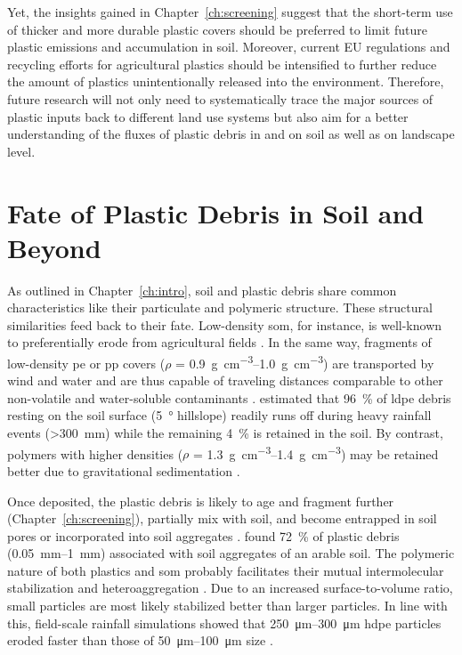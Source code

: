 Yet, the insights gained in Chapter~\ref{ch:screening} suggest that the short-term use of thicker and more durable plastic covers should be preferred to limit future plastic emissions and accumulation in soil. Moreover, current EU regulations \citep{EN13655Plastics2018} and recycling efforts for agricultural plastics should be intensified to further reduce the amount of plastics unintentionally released into the environment.
Therefore, future research will not only need to systematically trace the major sources of plastic inputs back to different land use systems but also aim for a better understanding of the fluxes of plastic debris in and on soil as well as on landscape level.

\section{Fate of Plastic Debris in Soil and Beyond}
\label{sec:general-discussion:fate}

As outlined in Chapter~\ref{ch:intro}, soil and plastic debris share common characteristics like their particulate and polymeric structure. These structural similarities feed back to their fate.
Low-density \ac{som}, for instance, is well-known to preferentially erode from agricultural fields \citep{LalSoil2005,RumpelPreferential2006}. In the same way, fragments of low-density \ac{pe} or \ac{pp} covers ($\rho$ = \SIrange{0.9}{1.0}{\gram\per\cubic\centi\meter}) are transported by wind \citep{RezaeiWind2019,BullardPreferential2021} and water \citep{LaermannsTracing2021,RehmSoil2021} and are thus capable of traveling distances comparable to other non-volatile and water-soluble contaminants \citep{StubbinsPlastics2021}.  estimated that \SI{96}{\percent} of \ac{ldpe} debris resting on the soil surface (\SI{5}{\degree} hillslope) readily runs off during heavy rainfall events (\SI{>300}{\milli\meter}) while the remaining \SI{4}{\percent} is retained in the soil. By contrast, polymers with higher densities ($\rho$ = \SIrange{1.3}{1.4}{\gram\per\cubic\centi\meter}) may be retained better due to gravitational sedimentation \citep{DongTransport2021,O'ConnorMicroplastics2019}.

Once deposited, the plastic debris is likely to age and fragment further (Chapter~\ref{ch:screening}), partially mix with soil, and become entrapped in soil pores or incorporated into soil aggregates \citep{RilligMicroplastic2017}.  found \SI{72}{\percent} of plastic debris (\SIrange{0.05}{1}{\milli\meter}) associated with soil aggregates of an arable soil. The polymeric nature of both plastics and \ac{som} probably facilitates their mutual intermolecular stabilization and heteroaggregation \citep{SchaumannSoil2006,RenMicroplastics2021}. Due to an increased surface-to-volume ratio, small particles are most likely stabilized better than larger particles. In line with this, field-scale rainfall simulations showed that \SIrange{250}{300}{\micro\meter} \ac{hdpe} particles eroded faster than those of \SIrange{50}{100}{\micro\meter} size \citep{RehmSoil2021}.

